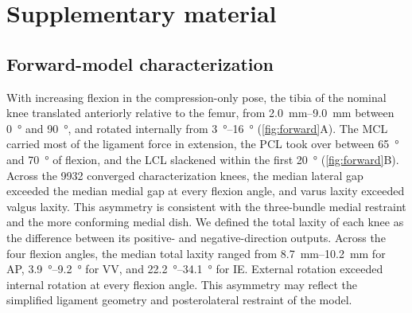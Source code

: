 \section{Supplementary material}
\setcounter{figure}{0}
\renewcommand{\thefigure}{S\arabic{figure}}
\setcounter{table}{0}
\renewcommand{\thetable}{S\arabic{table}}

\subsection*{Forward-model characterization}

With increasing flexion in the compression-only pose, the tibia of the nominal knee translated anteriorly relative to the femur, from \SIrange{2.0}{9.0}{\milli\meter} between \SI{0}{\degree} and \SI{90}{\degree}, and rotated internally from \SIrange{3}{16}{\degree} (\autoref{fig:forward}A).
The MCL carried most of the ligament force in extension, the PCL took over between \SI{65}{\degree} and \SI{70}{\degree} of flexion, and the LCL slackened within the first \SI{20}{\degree} (\autoref{fig:forward}B).
Across the \num{9932} converged characterization knees, the median lateral gap exceeded the median medial gap at every flexion angle, and varus laxity exceeded valgus laxity.
This asymmetry is consistent with the three-bundle medial restraint and the more conforming medial dish.
We defined the total laxity of each knee as the difference between its positive- and negative-direction outputs.
Across the four flexion angles, the median total laxity ranged from \SIrange{8.7}{10.2}{\milli\meter} for AP, \SIrange{3.9}{9.2}{\degree} for VV, and \SIrange{22.2}{34.1}{\degree} for IE.
External rotation exceeded internal rotation at every flexion angle.
This asymmetry may reflect the simplified ligament geometry and posterolateral restraint of the model.

